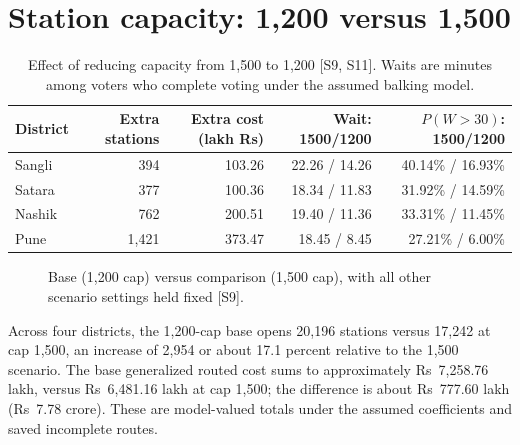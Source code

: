 \documentclass[11pt,a4paper,oneside]{report}
\begin{document}
\section{Station capacity: 1,200 versus 1,500}
\begin{table}[htbp]\centering
\small
\setlength{\tabcolsep}{5pt}
\caption{Effect of reducing capacity from 1,500 to 1,200 [S9, S11]. Waits are minutes among voters who complete voting under the assumed balking model.}
\begin{tabular}{lrrrr}
\toprule
District & Extra stations & Extra cost (lakh Rs) & Wait: 1500/1200 & $P(W>30)$: 1500/1200\\
\midrule
Sangli & 394 & 103.26 & 22.26 / 14.26 & 40.14\% / 16.93\%\\
Satara & 377 & 100.36 & 18.34 / 11.83 & 31.92\% / 14.59\%\\
Nashik & 762 & 200.51 & 19.40 / 11.36 & 33.31\% / 11.45\%\\
Pune & 1,421 & 373.47 & 18.45 / 8.45 & 27.21\% / 6.00\%\\
\bottomrule\end{tabular}
\end{table}
\begin{figure}[htbp]\centering
{}
\caption{Base (1,200 cap) versus comparison (1,500 cap), with all other scenario settings held fixed [S9].}\end{figure}
Across four districts, the 1,200-cap base opens 20,196 stations versus 17,242 at cap 1,500, an increase of 2,954 or about 17.1 percent relative to the 1,500 scenario. The base generalized routed cost sums to approximately Rs~7,258.76 lakh, versus Rs~6,481.16 lakh at cap 1,500; the difference is about Rs~777.60 lakh (Rs~7.78 crore). These are model-valued totals under the assumed coefficients and saved incomplete routes.
\end{document}
